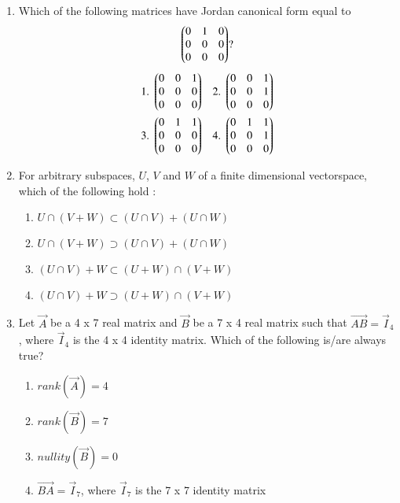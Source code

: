 \renewcommand{\theequation}{\theenumi}
\renewcommand{\thefigure}{\theenumi}
\begin{enumerate}[label=\thesection.\arabic*.,ref=\thesection.\theenumi]

\item Which of the following matrices have Jordan canonical form equal to
\begin{align*}
        \begin{pmatrix}0&1&0\\0&0&0\\0&0&0\end{pmatrix}?
\end{align*}
\begin{align*}
    \mbox{1. }\begin{pmatrix}0&0&1\\0&0&0\\0&0&0\end{pmatrix}&&\mbox{2. }\begin{pmatrix}0&0&1\\0&0&1\\0&0&0\end{pmatrix}\\
    \mbox{3. }\begin{pmatrix}0&1&1\\0&0&0\\0&0&0\end{pmatrix}&&\mbox{4. }\begin{pmatrix}0&1&1\\0&0&1\\0&0&0\end{pmatrix}
\end{align*}
%
\solution

\item For arbitrary subspaces, $U$, $V$ and $W$ of a finite dimensional vectorspace, which of the following hold :
\begin{enumerate}
    \item $U \cap (V+W) \subset (U \cap V) + (U \cap W)$
    \item $U \cap (V+W) \supset (U \cap V) + (U \cap W)$
    \item $(U \cap V) + W \subset (U+W) \cap (V+W)$
    \item $(U \cap V) + W \supset (U+W) \cap (V+W)$
\end{enumerate}
%
%
\solution

\item Let $\vec{A}$ be a 4 x 7 real matrix and $\vec{B}$ be a 7 x 4 real matrix such that $\vec{AB} = \vec{I}_4$, where $\vec{I}_4$ is the 4 x 4 identity matrix. Which of the following is/are always true?
\begin{enumerate} %
\item $rank(\vec{A}) = 4 $
\item $rank(\vec{B}) = 7 $
\item $nullity(\vec{B}) = 0 $
\item $\vec{BA} = \vec{I}_7 $, where $\vec{I}_7$ is the 7 x 7 identity matrix

\end{enumerate}
\end{enumerate}
